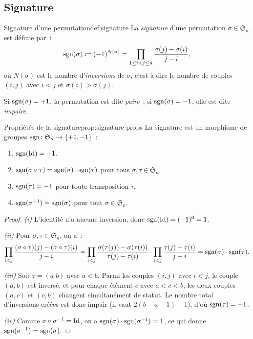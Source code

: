 \subsection{Signature}\label{subsec:signature}

\begin{definition}{Signature d'une permutation}{def:signature}
  La \emph{signature} d'une permutation
  $\sigma\in\mathfrak{S}_n$ est définie par~:
  \[
    \operatorname{sgn}(\sigma)\coloneqq(-1)^{N(\sigma)}
    =\prod_{1\leq i<j\leq n}\frac{\sigma(j)-\sigma(i)}{j-i},
  \]
  où $N(\sigma)$ est le nombre d'\emph{inversions} de
  $\sigma$, c'est-à-dire le nombre de couples $(i,j)$ avec $i<j$ et
  $\sigma(i)>\sigma(j)$.

  Si $\operatorname{sgn}(\sigma)=+1$, la permutation est dite \emph{paire}~;
  si $\operatorname{sgn}(\sigma)=-1$, elle est dite \emph{impaire}.
\end{definition}

\begin{proposition}{Propriétés de la signature}{prop:signature-props}
  La signature est un morphisme de groupes
  $\operatorname{sgn}\colon\mathfrak{S}_n\to\left\{+1,-1\right\}$~:
  \begin{enumerate}[label=(\roman*)]
    \item $\operatorname{sgn}(\operatorname{Id})=+1$.
    \item $\operatorname{sgn}(\sigma\circ\tau)=\operatorname{sgn}(\sigma)\cdot\operatorname{sgn}(\tau)$ pour tous
      $\sigma,\tau\in\mathfrak{S}_n$.
    \item $\operatorname{sgn}(\tau)=-1$ pour toute transposition $\tau$.
    \item $\operatorname{sgn}({\sigma}^{-1})=\operatorname{sgn}(\sigma)$ pour tout
      $\sigma\in\mathfrak{S}_n$.
  \end{enumerate}
\end{proposition}

\begin{proof}
  \emph{(i)} L'identité n'a aucune inversion, donc $\operatorname{sgn}(\operatorname{Id})=(-1)^0=1$.

  \emph{(ii)} Pour $\sigma,\tau\in\mathfrak{S}_n$, on a~:
  \[
    \prod_{i<j}\frac{(\sigma\circ\tau)(j)-(\sigma\circ\tau)(i)}{j-i}
    =\prod_{i<j}\frac{\sigma(\tau(j))-\sigma(\tau(i))}{\tau(j)-\tau(i)}
    \cdot\prod_{i<j}\frac{\tau(j)-\tau(i)}{j-i}
    =\operatorname{sgn}(\sigma)\cdot\operatorname{sgn}(\tau).
  \]

  \emph{(iii)} Soit $\tau=(a\;b)$ avec $a<b$. Parmi les couples $(i,j)$
  avec $i<j$, le couple $(a,b)$ est inversé, et pour chaque élément $c$
  avec $a<c<b$, les deux couples $(a,c)$ et $(c,b)$ changent
  simultanément de statut. Le nombre total d'inversions créées est donc
  impair (il vaut $2(b-a-1)+1$), d'où $\operatorname{sgn}(\tau)=-1$.

  \emph{(iv)} Comme $\sigma\circ{\sigma}^{-1}=\operatorname{Id}$, on a
  $\operatorname{sgn}(\sigma)\cdot\operatorname{sgn}({\sigma}^{-1})=1$, ce qui donne
  $\operatorname{sgn}({\sigma}^{-1})=\operatorname{sgn}(\sigma)$.
\end{proof}


